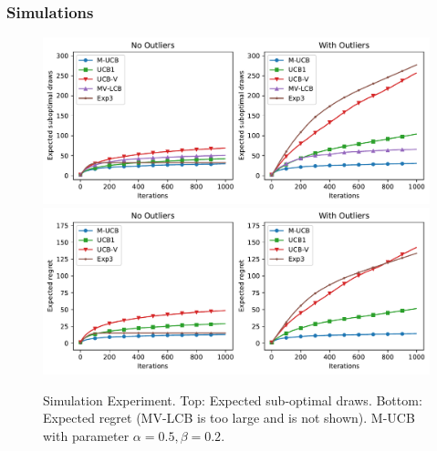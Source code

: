 \subsubsection{Simulations}
\label{subsec: Simulations}

\begin{table}[t]
\caption{Simulated reward distributions for 3 arms. The reward distributions are absolute Gaussian and Exponential distribution (details in Appendix \ref{app-sec: special case}). }
\label{table: Simulated reward distributions for 3-arm setting.}
\end{table}

\begin{figure}[t]
    \centering
    \includegraphics[scale=0.4]{plots/Exper_sd.pdf}
    \includegraphics[scale=0.4]{plots/Exper_r.pdf}
    \caption{Simulation Experiment.%
    Top: Expected sub-optimal draws.
    Bottom: Expected regret (MV-LCB is too large and is not shown).
    M-UCB with parameter $\alpha = 0.5, \beta = 0.2$.
    }
    \label{fig: Simulated experiment.}
\end{figure}

